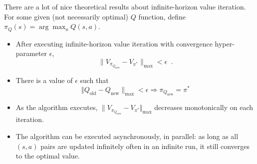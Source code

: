 There are a lot of nice theoretical results about infinite-horizon value iteration.
For some given (not necessarily optimal) $Q$ function, define
$\pi_{Q}(s) = \arg\max_{a}Q(s, a)$.
\begin{itemize}
  \item After executing infinite-horizon value
        iteration with convergence hyper-parameter $\epsilon$,
        \begin{equation}
          \lVert  V_{\pi_{Q_{\text{new}}}} - V_{\pi^*} \rVert_{\text{max}} < \epsilon \;\; .
        \end{equation}
  \item
        There is a value of $\epsilon$ such that
        \begin{equation}
          \Vert Q_{\text{old}} - Q_{\text{new}} \rVert_{\text{max}} <
          \epsilon \Longrightarrow \pi_{Q_{\text{new}}} = \pi^*
        \end{equation}
  \item  As the algorithm executes,
        $\lVert V_{\pi_{Q_{\text{new}}}} - V_{\pi^*} \Vert_{\text{max}}$ decreases
        monotonically on each iteration.
  \item The algorithm  can be executed asynchronously, in parallel: as
        long as all $(s, a)$ pairs are updated infinitely often in an
        infinite run, it still converges to the optimal value.

\end{itemize}

